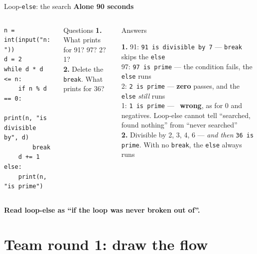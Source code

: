 \documentclass[aspectratio=169]{beamer}
\newcommand{\keyline}[1]{\vfill\begin{center}\textcolor{bkblue}{\textbf{#1}}\end{center}\vspace*{0.2em}}
\newcommand{\code}[1]{\texttt{#1}}
\newcommand{\badlabel}[1]{\textcolor{badred}{\ding{55}~\textbf{#1}}}
\newcommand{\timing}[2]{\hfill{\small\textcolor{bkblue}{\textbf{#1 \textbullet{} #2}}}}
\begin{document}
\begin{frame}[fragile]{Loop-\texttt{else}: the search \timing{Alone}{90 seconds}}
  \begin{columns}[T,onlytextwidth]
\begin{lstlisting}[language=Py]
n = int(input("n: "))
d = 2
while d * d <= n:
    if n % d == 0:
        print(n, "is divisible by", d)
        break
    d += 1
else:
    print(n, "is prime")
\end{lstlisting}
    \vspace{0.2em}
    \begin{discussionbox}{Questions}
      \small
      \textbf{1.} What prints for 91? 97? 2? 1?\\
      \textbf{2.} Delete the \code{break}. What prints for 36?
    \end{discussionbox}
    \pause
    \begin{contextbox}{Answers}
      \footnotesize\raggedright
      \textbf{1.} 91: \code{91 is divisible by 7} --- \code{break} skips the \code{else}\\
      97: \code{97 is prime} --- the condition fails, the \code{else} runs\\
      2: \code{2 is prime} --- \textbf{zero} passes, and the \code{else} \emph{still}
      runs\\
      1: \code{1 is prime} --- \badlabel{wrong}, as for 0 and negatives. Loop-else cannot
      tell ``searched, found nothing'' from ``never searched''\\[0.3em]
      \textbf{2.} Divisible by 2, 3, 4, 6 --- \emph{and then} \code{36 is prime}. With no
      \code{break}, the \code{else} always runs
    \end{contextbox}
  \end{columns}
  \keyline{Read loop-else as ``if the loop was never broken out of''.}
\end{frame}

\section{Team round 1: draw the flow}
\end{document}
